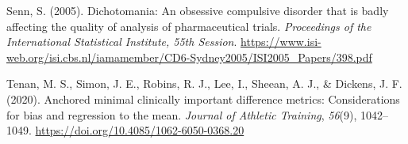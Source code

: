 \documentclass[]{cik}%
\newlength{\cslhangindent}
\newlength{\cslentryspacingunit} %
\newenvironment{CSLReferences}[2] %
 {%
  \setlength{\parindent}{0pt}
  \ifodd #1
  \let\oldpar\par
  \def\par{\hangindent=\cslhangindent\oldpar}
  \fi
  \setlength{\parskip}{#2\cslentryspacingunit}
 }%
 {}
\begin{document}
\begin{CSLReferences}{1}{0}
\leavevmode{}%
Senn, S. (2005). Dichotomania: An obsessive compulsive disorder that is
badly affecting the quality of analysis of pharmaceutical trials.
\emph{Proceedings of the International Statistical Institute, 55th
Session}.
\url{https://www.isi-web.org/isi.cbs.nl/iamamember/CD6-Sydney2005/ISI2005_Papers/398.pdf}

\leavevmode{}%
Tenan, M. S., Simon, J. E., Robins, R. J., Lee, I., Sheean, A. J., \&
Dickens, J. F. (2020). Anchored minimal clinically important difference
metrics: Considerations for bias and regression to the mean.
\emph{Journal of Athletic Training}, \emph{56}(9), 1042--1049.
\url{https://doi.org/10.4085/1062-6050-0368.20}

\end{CSLReferences}

%
%

%
%
%
%
\end{document}
